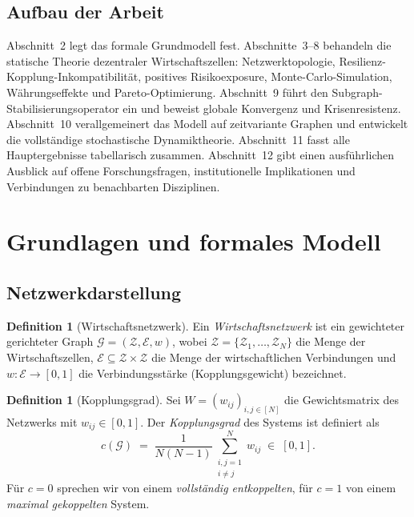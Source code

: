 \documentclass[a4paper, 12pt, twoside, openright]{report}
\theoremstyle{definition}
\newtheorem{definition}[theorem]{Definition}
\theoremstyle{definition}
\begin{document}
\subsection{Aufbau der Arbeit}

Abschnitt~2 legt das formale Grundmodell fest. Abschnitte~3--8 behandeln die statische
Theorie dezentraler Wirtschaftszellen: Netzwerktopologie, Resilienz-Kopplung-Inkompatibilität,
positives Risikoexposure, Monte-Carlo-Simulation, Währungseffekte und Pareto-Optimierung.
Abschnitt~9 führt den Subgraph-Stabilisierungsoperator ein und beweist globale Konvergenz
und Krisenresistenz. Abschnitt~10 verallgemeinert das Modell auf zeitvariante Graphen und
entwickelt die vollständige stochastische Dynamiktheorie. Abschnitt~11 fasst alle
Hauptergebnisse tabellarisch zusammen. Abschnitt~12 gibt einen ausführlichen Ausblick auf
offene Forschungsfragen, institutionelle Implikationen und Verbindungen zu benachbarten
Disziplinen.

\section{Grundlagen und formales Modell}

\subsection{Netzwerkdarstellung}

\begin{definition}[Wirtschaftsnetzwerk]
    Ein \emph{Wirtschaftsnetzwerk} ist ein gewichteter gerichteter Graph
    $\mathcal{G} = (\mathcal{Z}, \mathcal{E}, w)$, wobei
    $\mathcal{Z} = \{\mathcal{Z}_1, \ldots, \mathcal{Z}_N\}$ die Menge der Wirtschaftszellen,
    $\mathcal{E} \subseteq \mathcal{Z} \times \mathcal{Z}$ die Menge der wirtschaftlichen
    Verbindungen und $w : \mathcal{E} \to [0,1]$ die Verbindungsstärke (Kopplungsgewicht)
    bezeichnet.
\end{definition}

\begin{definition}[Kopplungsgrad]
\label{def:kopplungsgrad}
    Sei $W = (w_{ij})_{i,j \in [N]}$ die Gewichtsmatrix des Netzwerks mit $w_{ij} \in [0,1]$.
    Der \emph{Kopplungsgrad} des Systems ist definiert als
    \[
        c(\mathcal{G}) \;=\; \frac{1}{N(N-1)} \sum_{\substack{i,j=1\\i\neq j}}^{N} w_{ij}
        \;\in\; [0,1].
    \]
    Für $c = 0$ sprechen wir von einem \emph{vollständig entkoppelten}, für $c = 1$ von einem
    \emph{maximal gekoppelten} System.
\end{definition}
\end{document}
